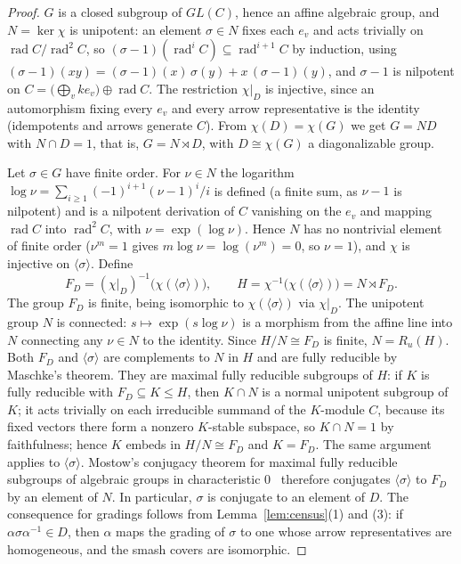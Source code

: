 \documentclass[11pt]{amsart}
\theoremstyle{plain}
\theoremstyle{definition}
\DeclareMathOperator{\rad}{rad}
\begin{document}
\begin{proof}
$G$ is a closed subgroup of $GL(C)$, hence an affine algebraic group, and $N=\ker\chi$ is unipotent: an
element $\sigma\in N$ fixes each $e_v$ and acts trivially on $\rad C/\rad^2 C$, so
$(\sigma-1)(\rad^iC)\subseteq\rad^{i+1}C$ by induction, using
$(\sigma-1)(xy)=(\sigma-1)(x)\,\sigma(y)+x\,(\sigma-1)(y)$, and $\sigma-1$ is nilpotent on
$C=\bigl(\bigoplus_v ke_v\bigr)\oplus\rad C$. The restriction $\chi|_D$ is injective, since an automorphism
fixing every $e_v$ and every arrow representative is the identity (idempotents and arrows generate $C$). From
$\chi(D)=\chi(G)$ we get $G=ND$ with $N\cap D=1$, that is, $G=N\rtimes D$, with $D\cong\chi(G)$ a
diagonalizable group.

Let $\sigma\in G$ have finite order. For $\nu\in N$ the logarithm $\log\nu=\sum_{i\ge1}(-1)^{i+1}(\nu-1)^i/i$
is defined (a finite sum, as $\nu-1$ is nilpotent) and is a nilpotent derivation of $C$ vanishing on the $e_v$
and mapping $\rad C$ into $\rad^2C$, with $\nu=\exp(\log\nu)$. Hence $N$ has no nontrivial element of finite
order ($\nu^m=1$ gives $m\log\nu=\log(\nu^m)=0$, so $\nu=1$), and $\chi$ is injective on
$\langle\sigma\rangle$. Define
\[
 F_D=(\chi|_D)^{-1}\bigl(\chi(\langle\sigma\rangle)\bigr),\qquad
 H=\chi^{-1}\bigl(\chi(\langle\sigma\rangle)\bigr)=N\rtimes F_D.
\]
The group $F_D$ is finite, being isomorphic to $\chi(\langle\sigma\rangle)$ via $\chi|_D$. The unipotent group
$N$ is connected: $s\mapsto\exp(s\log\nu)$ is a morphism from the affine line into $N$ connecting any $\nu\in
N$ to the identity. Since $H/N\cong F_D$ is finite, $N=R_u(H)$. Both $F_D$ and $\langle\sigma\rangle$ are
complements to $N$ in $H$ and are fully reducible by Maschke's theorem. They are maximal fully reducible
subgroups of $H$: if $K$ is fully reducible with $F_D\subseteq K\le H$, then $K\cap N$ is a normal unipotent
subgroup of $K$; it acts trivially on each irreducible summand of the $K$-module $C$, because its fixed
vectors there form a nonzero $K$-stable subspace, so $K\cap N=1$ by faithfulness; hence $K$ embeds in
$H/N\cong F_D$ and $K=F_D$. The same argument applies to $\langle\sigma\rangle$. Mostow's conjugacy theorem
for maximal fully reducible subgroups of algebraic groups in characteristic $0$~\cite[Theorem~7.1]{Mostow}
therefore conjugates $\langle\sigma\rangle$ to $F_D$ by an element of $N$. In particular, $\sigma$ is
conjugate to an element of $D$. The consequence for gradings follows from Lemma~\ref{lem:census}(1) and (3):
if $\alpha\sigma\alpha^{-1}\in D$, then $\alpha$ maps the grading of $\sigma$ to one whose arrow
representatives are homogeneous, and the smash covers are isomorphic.
\end{proof}
\end{document}
